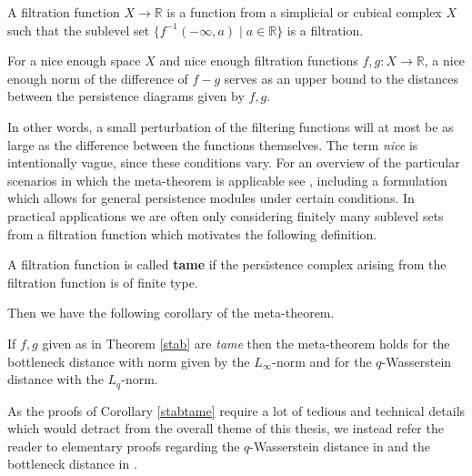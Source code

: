   \begin{definition}
    A filtration function $X \to \mathbb{R}$ is a function from a simplicial or cubical complex $X$ such that the sublevel set $\{ f^{-1}(-\infty,a) \mid a \in \mathbb{R} \}$ is a filtration.
  \end{definition}

  \begin{theorem}\label{stab}
    For a nice enough space $X$ and nice enough filtration functions $f,g: X \to \mathbb{R}$, a nice enough norm of the difference of $f-g$ serves as an upper bound to the distances between the persistence diagrams given by $f,g$.
  \end{theorem}

  In other words, a small perturbation of the filtering functions will at most be as large as the difference between the functions themselves. The term \textit{nice} is intentionally vague, since these conditions vary. For an overview of the particular scenarios in which the meta-theorem is applicable see \cite{vejdemo}, including a formulation which allows for general persistence modules under certain conditions. In practical applications we are often only considering finitely many sublevel sets from a filtration function which motivates the following definition.

  \begin{definition}
    A filtration function is called \textbf{tame} if the persistence complex arising from the filtration function is of finite type.
  \end{definition}

Then we have the following corollary of the meta-theorem.

  \begin{corollary}\label{stabtame}
    If $f,g$ given as in Theorem \ref{stab} are \textit{tame} then the meta-theorem holds for the bottleneck distance with norm given by the $L_{\infty}$-norm and for the $q$-Wasserstein distance with the $L_{q}$-norm.
  \end{corollary}
  As the proofs of Corollary \ref{stabtame} require a lot of tedious and technical details which would detract from the overall theme of this thesis, we instead refer the reader to elementary proofs regarding the $q$-Wasserstein distance in \cite{skraba2021wasserstein} and the bottleneck distance in \cite{skraba2021notes}.
